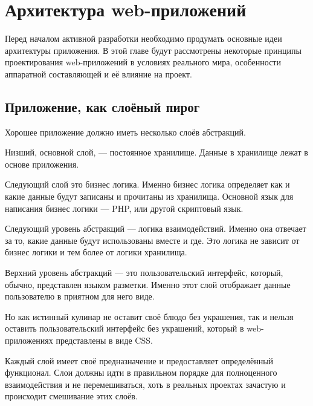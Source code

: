 \chapter{ Архитектура web-приложений } \label{chapt1}


Перед началом активной разработки необходимо продумать основные идеи архитектуры приложения. В этой главе будут рассмотрены некоторые принципы проектирования web-приложений в условиях реального мира, особенности аппаратной составляющей и её влияние на проект.

\section{ Приложение, как слоёный пирог} \label{sect1_1}

Хорошее приложение должно иметь несколько слоёв абстракций.

Низший, основной слой, --- постоянное хранилище. Данные в хранилище лежат в основе приложения. 


Следующий слой это бизнес логика. Именно бизнес логика определяет как  и какие данные будут записаны и прочитаны из хранилища. Основной язык для написания бизнес логики --- PHP, или другой скриптовый язык.

Следующий уровень абстракций --- логика взаимодействий. Именно она отвечает за то, какие данные будут использованы вместе и где. Это логика не зависит от бизнес логики и тем более от логики хранилища.

Верхний уровень абстракций --- это пользовательский интерфейс, который, обычно, представлен языком разметки. Именно этот слой отображает данные пользователю в приятном для него виде.

Но как истинный кулинар не оставит своё блюдо без украшения, так и нельзя оставить пользовательский интерфейс без украшений, который в web-приложениях представлены в виде CSS.

Каждый слой имеет своё предназначение и предоставляет определённый функционал. Слои должны идти в правильном порядке для полноценного взаимодействия и не перемешиваться, хоть в реальных проектах зачастую и происходит смешивание этих слоёв.


